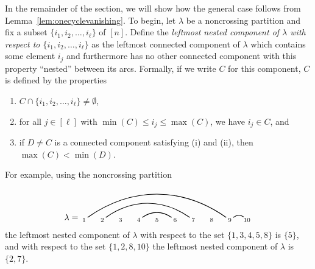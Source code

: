 \documentclass[12pt]{amsart}
\theoremstyle{definition}
\theoremstyle{remark}
\numberwithin{equation}{section}
\begin{document}
In the remainder of the section, we will show how the general case follows from Lemma~\ref{lem:onecyclevanishing}.  To begin, let $\lambda$ be a noncrossing partition and fix a subset $\{i_{1}, i_{2}, \ldots, i_{\ell}\}$ of $[n]$.  
Define the \emph{leftmost nested component of $\lambda$ with respect to $\{i_{1}, i_{2}, \ldots, i_{\ell}\}$} as the leftmost connected component of $\lambda$ which contains some element $i_{j}$ and furthermore has no other connected component with this property ``nested'' between its arcs.  Formally, if we write $C$ for this component, $C$ is defined by the properties 
\begin{enumerate}[label = (\roman*), itemsep = 1ex]
\item $C \cap \{i_{1}, i_{2}, \ldots, i_{\ell}\} \neq \emptyset$,

\item for all $j \in [\ell]$ with $\min(C) \le i_{j} \le \max(C)$, we have $i_{j} \in C$, and

\item if $D \neq C$ is a connected component satisfying (i) and (ii), then $\max(C) < \min(D)$.

\end{enumerate}

For example, using the noncrossing partition
\[
\lambda = \begin{tikzpicture}[scale = 0.75, baseline = 0.75*-0.2]
\foreach \x in {1, ..., 9}{\draw[fill] (\x - 1, 0) node[inner sep = 2pt] (\x) {$\scriptstyle \x$};}
\draw[fill] (10 - 1, 0) node[inner sep = 2pt] (10) {$\hspace{-0.25em} \scriptstyle 10$};
\foreach \i\j in { 4/6, 2/7,1/9, 9/10}{\draw[thick] (\i) to[out = 35, in = 145] (\j);}
\end{tikzpicture}
\]
the leftmost nested component of $\lambda$ with respect to the set $\{1, 3, 4, 5, 8\}$ is $\{5\}$, and with respect to the set $\{1, 2, 8, 10\}$ the leftmost nested component of $\lambda$ is $\{2, 7\}$.
\end{document}
